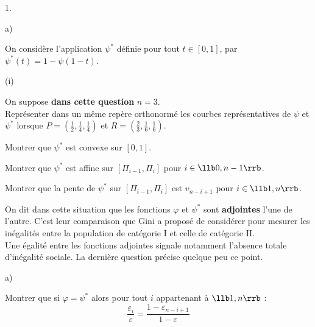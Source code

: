 \begin{noliste}{1.}
\begin{noliste}{a)}
  
  
  

  
  \item On considère l'application $\psi^*$ définie pour tout $t \in 
  [0,1]$, par $\psi^*(t)= 1-\psi(1-t)$. 
  \begin{nonoliste}{(i)}
   \item On suppose \textbf{dans cette question} $n=3$.\\
   Représenter dans un même repère orthonormé les courbes 
   représentatives de $\psi$ et $\psi^*$ lorsque $P= \left( 
   \frac{1}{2}, \frac{1}{4}, \frac{1}{4} \right)$ et $R=\left( 
   \frac{2}{3}, \frac{1}{6}, \frac{1}{6}  \right)$. 
   
   
   
   \item Montrer que $\psi^*$ est convexe sur $[0,1]$. 
   
   

   
   \item Montrer que $\psi^*$ est affine sur $[\Pi_{i-1}, \Pi_i]$ pour 
   $i \in \llb 0,n-1 \rrb$. 
   
   

   
   \item Montrer que la pente de $\psi^*$ sur $[\Pi_{i-1}, \Pi_i]$ est 
   $v_{n-i+1}$ pour $i \in \llb 1,n \rrb$. 
   
   
  \end{nonoliste}

  \noindent
  On dit dans cette situation que les fonctions $\varphi$ et $\psi^*$ 
  sont \textbf{adjointes} l'une de l'autre. C'est leur comparaison que 
  Gini a proposé de considérer pour \og mesurer les inégalités \fg{} 
  entre la population de catégorie I et celle de catégorie II. \\
  Une égalité entre les fonctions adjointes signale notamment l'absence 
  totale d'inégalité sociale. La dernière question précise quelque peu 
  ce point. 
 \end{noliste}
 
 \item 
 \begin{noliste}{a)}
  \setlength{\itemsep}{2mm}
  \item Montrer que si $\varphi= \psi^*$ alors pour tout $i$ 
  appartenant à $\llb 1,n \rrb$ :
  \[
   \dfrac{\varepsilon_i}{\varepsilon} = 
   \dfrac{1-\varepsilon_{n-i+1}}{1-\varepsilon}
  \]
  
  
  

\end{noliste}
\end{noliste}

